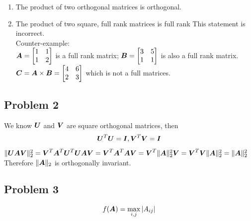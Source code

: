 \documentclass{article}
\begin{document}
\begin{enumerate}
\item The product of two orthogonal matrices is orthogonal.

\item The product of two square, full rank matrices is full rank
This statement is incorrect. \\
Counter-example:\\
$\boldsymbol{A}=\begin{bmatrix} 1&1\\1&2 \end{bmatrix}$ is a full rank matrix; \newline
$\boldsymbol{B}=\begin{bmatrix} 3&5\\1&1 \end{bmatrix}$ is also a full rank matrix.\newline
$\boldsymbol{C} = \boldsymbol{A}\times\boldsymbol{B} = \begin{bmatrix} 4&6\\2&3 \end{bmatrix} $ which is not a full matrices.  \newline


\end{enumerate} 

\hypertarget{problem_2_prove_or_disprove_3}{}
\subsection*{{Problem 2}}
\label{problem_2_prove_or_disprove_3}
We know $\boldsymbol{U}$ and $\boldsymbol{V}$ are square orthogonal matrices, then
\begin{align}
\boldsymbol{U}^T\boldsymbol{U}=\boldsymbol{I},  \boldsymbol{V}^T\boldsymbol{V}=\boldsymbol{I} 
\end{align}
$\|\boldsymbol{U}\boldsymbol{A}\boldsymbol{V}\|_2^2
=\boldsymbol{V}^T\boldsymbol{A}^T\boldsymbol{U}^T\boldsymbol{U}\boldsymbol{A}\boldsymbol{V} \\
= \boldsymbol{V}^T\boldsymbol{A}^T\boldsymbol{A}\boldsymbol{V} \\
= \boldsymbol{V}^T\|\boldsymbol{A}\|_2^2\boldsymbol{V} \\
=\boldsymbol{V}^T\boldsymbol{V}\|\boldsymbol{A}\|_2^2 \\
=\|\boldsymbol{A}\|_2^2 \\$
Therefore $\|\boldsymbol{A}\|_2 $ is orthogonally invariant. \\

\hypertarget{problem_3_prove_or_disprove_3}{}
\subsection*{{Problem 3}}
\label{problem_1_prove_or_disprove_3}

\begin{align} 
f(\boldsymbol{A}) = \max_{i,j}|A_{ij}| 
\end{align} 
\end{document}
